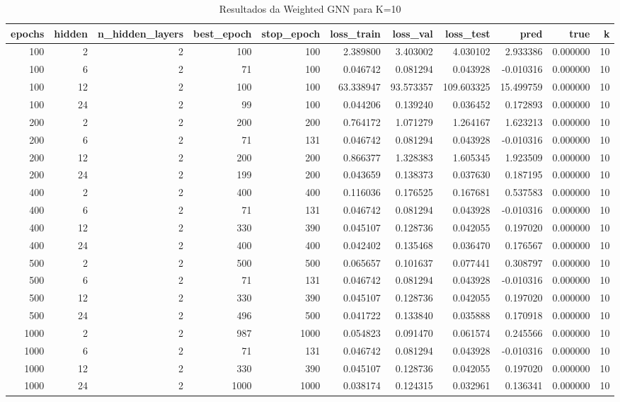 \begin{table}
\caption{Resultados da Weighted GNN para K=10}
\label{tab:weighted_gnn_results_k10}
\begin{tabular}{rrrrrrrrrrr}
\toprule
epochs & hidden & n\_hidden\_layers & best\_epoch & stop\_epoch & loss\_train & loss\_val & loss\_test & pred & true & k \\
\midrule
100 & 2 & 2 & 100 & 100 & 2.389800 & 3.403002 & 4.030102 & 2.933386 & 0.000000 & 10 \\
100 & 6 & 2 & 71 & 100 & 0.046742 & 0.081294 & 0.043928 & -0.010316 & 0.000000 & 10 \\
100 & 12 & 2 & 100 & 100 & 63.338947 & 93.573357 & 109.603325 & 15.499759 & 0.000000 & 10 \\
100 & 24 & 2 & 99 & 100 & 0.044206 & 0.139240 & 0.036452 & 0.172893 & 0.000000 & 10 \\
200 & 2 & 2 & 200 & 200 & 0.764172 & 1.071279 & 1.264167 & 1.623213 & 0.000000 & 10 \\
200 & 6 & 2 & 71 & 131 & 0.046742 & 0.081294 & 0.043928 & -0.010316 & 0.000000 & 10 \\
200 & 12 & 2 & 200 & 200 & 0.866377 & 1.328383 & 1.605345 & 1.923509 & 0.000000 & 10 \\
200 & 24 & 2 & 199 & 200 & 0.043659 & 0.138373 & 0.037630 & 0.187195 & 0.000000 & 10 \\
400 & 2 & 2 & 400 & 400 & 0.116036 & 0.176525 & 0.167681 & 0.537583 & 0.000000 & 10 \\
400 & 6 & 2 & 71 & 131 & 0.046742 & 0.081294 & 0.043928 & -0.010316 & 0.000000 & 10 \\
400 & 12 & 2 & 330 & 390 & 0.045107 & 0.128736 & 0.042055 & 0.197020 & 0.000000 & 10 \\
400 & 24 & 2 & 400 & 400 & 0.042402 & 0.135468 & 0.036470 & 0.176567 & 0.000000 & 10 \\
500 & 2 & 2 & 500 & 500 & 0.065657 & 0.101637 & 0.077441 & 0.308797 & 0.000000 & 10 \\
500 & 6 & 2 & 71 & 131 & 0.046742 & 0.081294 & 0.043928 & -0.010316 & 0.000000 & 10 \\
500 & 12 & 2 & 330 & 390 & 0.045107 & 0.128736 & 0.042055 & 0.197020 & 0.000000 & 10 \\
500 & 24 & 2 & 496 & 500 & 0.041722 & 0.133840 & 0.035888 & 0.170918 & 0.000000 & 10 \\
1000 & 2 & 2 & 987 & 1000 & 0.054823 & 0.091470 & 0.061574 & 0.245566 & 0.000000 & 10 \\
1000 & 6 & 2 & 71 & 131 & 0.046742 & 0.081294 & 0.043928 & -0.010316 & 0.000000 & 10 \\
1000 & 12 & 2 & 330 & 390 & 0.045107 & 0.128736 & 0.042055 & 0.197020 & 0.000000 & 10 \\
1000 & 24 & 2 & 1000 & 1000 & 0.038174 & 0.124315 & 0.032961 & 0.136341 & 0.000000 & 10 \\
\bottomrule
\end{tabular}
\end{table}
